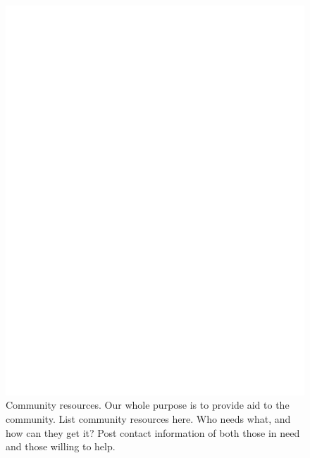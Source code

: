 \documentclass{report}
\begin{document}
\begin{figure}
	\centering
	\includegraphics[width=5in]{imageserver/uploadimages/image3.png}
	\caption{Community resources. Our whole purpose is to provide aid to the community. List community resources here.  Who needs what, and how can they get it? Post contact information of both those in need and those willing to help.}
\end{figure}
\end{document}
